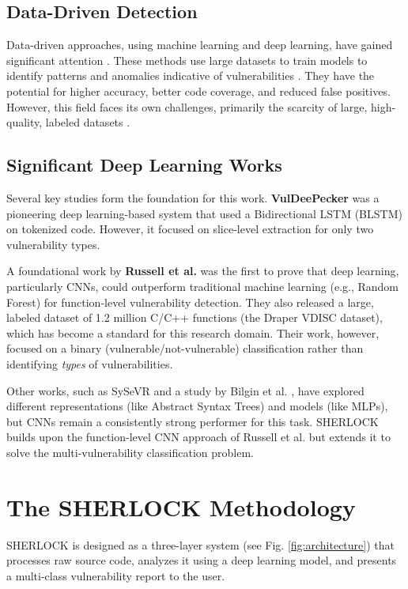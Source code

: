 \documentclass[conference]{IEEEtran}
\newcommand{\MYhyperreffix}{}
\let\MYhyperreffix\cite
\renewcommand{\cite}[1]{\MYhyperreffix{#1}}
\begin{document}
\subsection{Data-Driven Detection}
Data-driven approaches, using machine learning and deep learning, have gained significant attention \cite{russell_automated_2018}. These methods use large datasets to train models to identify patterns and anomalies indicative of vulnerabilities \cite{ghaffarian_software_2018}. They have the potential for higher accuracy, better code coverage, and reduced false positives. However, this field faces its own challenges, primarily the scarcity of large, high-quality, labeled datasets \cite{lin_software_2020, ghaffarian_software_2018, bilgin_vulnerability_2020}.

\subsection{Significant Deep Learning Works}
Several key studies form the foundation for this work. \textbf{VulDeePecker} \cite{li_vuldeepecker_2018} was a pioneering deep learning-based system that used a Bidirectional LSTM (BLSTM) on tokenized code. However, it focused on slice-level extraction for only two vulnerability types.

A foundational work by \textbf{Russell et al.} \cite{russell_automated_2018} was the first to prove that deep learning, particularly CNNs, could outperform traditional machine learning (e.g., Random Forest) for function-level vulnerability detection. They also released a large, labeled dataset of 1.2 million C/C++ functions (the Draper VDISC dataset), which has become a standard for this research domain. Their work, however, focused on a binary (vulnerable/not-vulnerable) classification rather than identifying \textit{types} of vulnerabilities.

Other works, such as SySeVR \cite{li_sysevr_2022} and a study by Bilgin et al. \cite{bilgin_vulnerability_2020}, have explored different representations (like Abstract Syntax Trees) and models (like MLPs), but CNNs remain a consistently strong performer for this task. SHERLOCK builds upon the function-level CNN approach of Russell et al. \cite{russell_automated_2018} but extends it to solve the multi-vulnerability classification problem.

\section{The SHERLOCK Methodology}
SHERLOCK is designed as a three-layer system (see Fig. \ref{fig:architecture}) that processes raw source code, analyzes it using a deep learning model, and presents a multi-class vulnerability report to the user.
\end{document}

